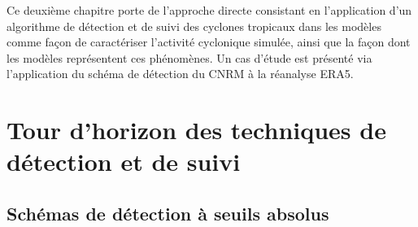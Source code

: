 \documentclass[../main.tex]{subfiles}
\begin{document}
\begin{itshape}
Ce deuxième chapitre porte de l'approche directe consistant en l'application d'un algorithme de détection et de suivi des cyclones tropicaux dans les modèles
comme façon de caractériser l'activité cyclonique simulée, ainsi que la façon dont les modèles représentent ces phénomènes. Un cas d'étude est présenté via
l'application du schéma de détection du CNRM à la réanalyse ERA5.
\end{itshape}

\minitoc\newpage
\section{Tour d'horizon des techniques de détection et de suivi}\label{sec:tour_horizon_tracking}

\subsection{Schémas de détection à seuils absolus}
\end{document}
